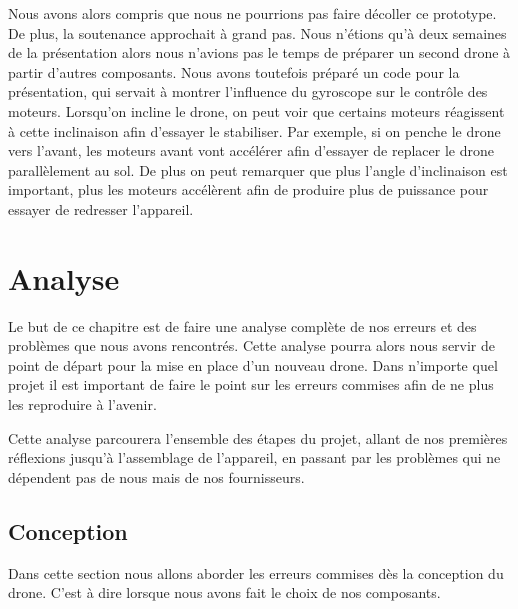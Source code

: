 \documentclass[a4paper,10pt]{report}
\begin{document}
	  Nous avons alors compris que nous ne pourrions pas faire décoller ce 
prototype. De plus, la soutenance approchait à grand pas. Nous n'étions qu'à 
deux semaines de la présentation alors nous n'avions pas le temps de préparer 
un 
second drone à partir d'autres composants. Nous avons toutefois préparé un code 
pour la présentation, qui servait à montrer l'influence du gyroscope sur le 
contrôle des moteurs. Lorsqu'on incline le drone, on peut voir que certains 
moteurs réagissent à cette inclinaison afin d'essayer le stabiliser. Par 
exemple, si on penche le drone vers l'avant, les moteurs avant vont accélérer 
afin d'essayer de replacer le drone parallèlement au sol. De plus on peut 
remarquer que plus l'angle d'inclinaison est important, plus les moteurs 
accélèrent afin de produire plus de puissance pour essayer de redresser 
l'appareil.

  \chapter{Analyse}
    Le but de ce chapitre est de faire une analyse complète de nos erreurs et 
des problèmes que nous avons rencontrés. Cette analyse pourra alors nous servir 
de point de départ pour la mise en place d'un nouveau drone. Dans n'importe 
quel projet il est important de faire le point sur les erreurs commises afin de 
ne plus les reproduire à l'avenir.

    Cette analyse parcourera l'ensemble des étapes du projet, allant de nos 
premières réflexions jusqu'à l'assemblage de l'appareil, en passant par les 
problèmes qui ne dépendent pas de nous mais de nos fournisseurs.

    \section{Conception}
      Dans cette section nous allons aborder les erreurs commises dès la 
conception du drone. C'est à dire lorsque nous avons fait le choix de nos 
composants.
\end{document}
